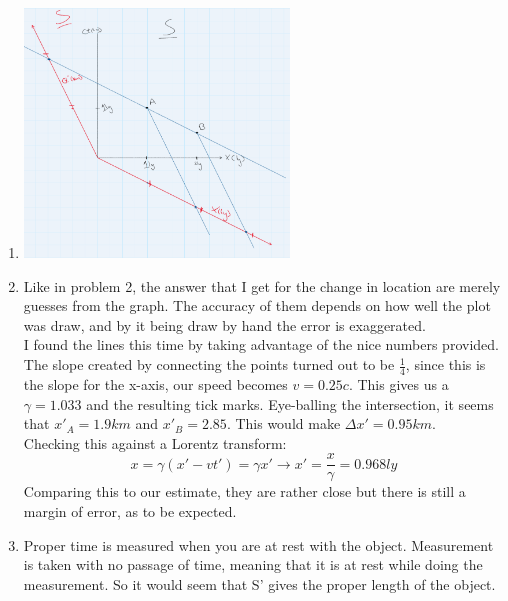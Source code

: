 \documentclass[11pt]{article}
\begin{document}
\begin{enumerate}[label=\alph*)]
    \item 
        \parbox{0}{ \includegraphics[width = 200pt]{Homework06/Homework2.PNG}}
        
    \item
        Like in problem 2, the answer that I get for the change in location are merely guesses from the graph. The accuracy of them depends on how well the plot was draw, and by it being draw by hand the error is exaggerated.\\
        I found the lines this time by taking advantage of the nice numbers provided. The slope created by connecting the points turned out to be $\frac{1}{4}$, since this is the slope for the x-axis, our speed becomes $v = 0.25c$. This gives us a $\gamma = 1.033$ and the resulting tick marks. Eye-balling the intersection, it seems that $x'_A = 1.9 km$ and $x'_B = 2.85$. This would make $\Delta x' = 0.95km$.\\
        Checking this against a Lorentz transform: 
        \[x = \gamma ( x' - vt') = \gamma x' \rightarrow x'=\frac{x}{\gamma} = 0.968 ly\]
        Comparing this to our estimate, they are rather close but there is still a margin of error, as to be expected.
    
    \item 
        Proper time is measured when you are at rest with the object. Measurement is taken with no passage of time, meaning that it is at rest while doing the measurement. So it would seem that S' gives the proper length of the object. 
        
\end{enumerate}
\end{document}
